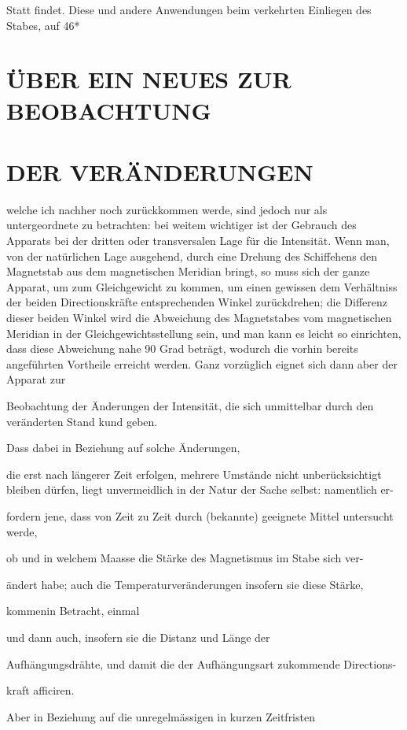 \documentclass[12pt,a4paper]{article}
\begin{document}
Statt findet. Diese und andere Anwendungen beim verkehrten Einliegen des Stabes, auf 46*

\section*{ÜBER EIN NEUES ZUR BEOBACHTUNG}
\section*{DER VERÄNDERUNGEN}
welche ich nachher noch zurückkommen werde, sind jedoch nur als untergeordnete zu betrachten: bei weitem wichtiger ist der Gebrauch des Apparats bei der dritten oder transversalen Lage für die Intensität. Wenn man, von der natürlichen Lage ausgehend, durch eine Drehung des Schiffehens den Magnetstab aus dem magnetischen Meridian bringt, so muss sich der ganze Apparat, um zum Gleichgewicht zu kommen, um einen gewissen dem Verhältniss der beiden Directionskräfte entsprechenden Winkel zurückdrehen; die Differenz dieser beiden Winkel wird die Abweichung des Magnetstabes vom magnetischen Meridian in der Gleichgewichtsstellung sein, und man kann es leicht so einrichten, dass diese Abweichung nahe 90 Grad beträgt, wodurch die vorhin bereits angeführten Vortheile erreicht werden. Ganz vorzüglich eignet sich dann aber der Apparat zur

Beobachtung der Änderungen der Intensität, die sich unmittelbar durch den veränderten Stand kund geben.

Dass dabei in Beziehung auf solche Änderungen,

die erst nach längerer Zeit erfolgen, mehrere Umstände nicht unberücksichtigt bleiben dürfen, liegt unvermeidlich in der Natur der Sache selbst: namentlich er-

fordern jene, dass von Zeit zu Zeit durch (bekannte) geeignete Mittel untersucht werde,

ob und in welchem Maasse die Stärke des Magnetismus im Stabe sich ver-

ändert habe; auch die Temperaturveränderungen insofern sie diese Stärke,

kommenin Betracht, einmal

und dann auch, insofern sie die Distanz und Länge der

Aufhängungsdrähte, und damit die der Aufhängungsart zukommende Directions-

kraft afficiren.

Aber in Beziehung auf die unregelmässigen in kurzen Zeitfristen
\end{document}
